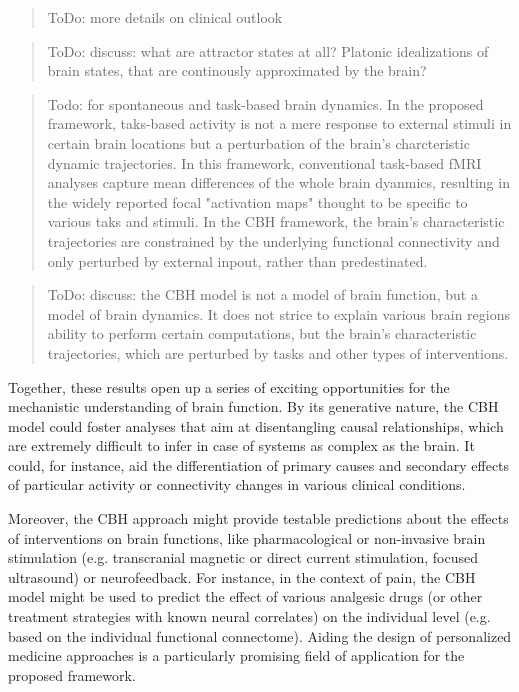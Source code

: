 \documentclass{article}
\begin{document}
\begin{quote}
ToDo: more details on clinical outlook
\end{quote}

\begin{quote}
ToDo: discuss: what are attractor states at all? Platonic idealizations of brain states, that are continously approximated by the brain?
\end{quote}

\begin{quote}
Todo: for spontaneous and task-based brain dynamics. In the proposed framework, taks-based activity is not a mere response to external stimuli in certain brain locations but a perturbation of the brain's charcteristic dynamic trajectories. In this framework, conventional task-based fMRI analyses capture mean differences of the whole brain dyanmics, resulting in the widely reported focal "activation maps" thought to be specific to various taks and stimuli. In the CBH framework, the brain's characteristic trajectories are constrained by the underlying functional connectivity and only perturbed by external inpout, rather than predestinated.
\end{quote}

\begin{quote}
ToDo: discuss: the CBH model is not a model of brain function, but a model of brain dynamics. It does not strice to explain various brain regions ability to perform certain computations, but the brain's characteristic trajectories, which are perturbed by tasks and other types of interventions.
\end{quote}

Together, these results open up a series of exciting opportunities for the mechanistic understanding of brain function. By its generative nature, the CBH model could foster analyses that aim at disentangling causal relationships, which are extremely difficult to infer in case of systems as complex as the brain. It could, for instance, aid the differentiation of primary causes and secondary effects of particular activity or connectivity changes in various clinical conditions.

Moreover, the CBH approach might provide testable predictions about the effects of interventions on brain functions, like pharmacological or non-invasive brain stimulation (e.g. transcranial magnetic or direct current stimulation, focused ultrasound) or neurofeedback.
For instance, in the context of pain, the CBH model might be used to predict the effect of various analgesic drugs (or other treatment strategies with known neural correlates) on the individual level (e.g. based on the individual functional connectome).
Aiding the design of personalized medicine approaches is a particularly promising field of application for the proposed framework.
\end{document}
